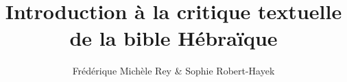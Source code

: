 






\usepackage[
]{biblatex}






\title{Introduction à la critique textuelle de la bible Hébraïque}
\author[Frédérique Michèle Rey, Sophie Robert-Hayek]{Frédérique Michèle Rey \& Sophie Robert-Hayek}



\date{}